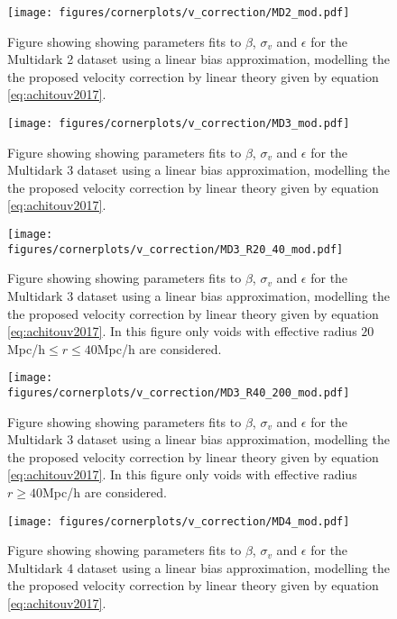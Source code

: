 \begin{figure}[htbp]
    \texttt{[image: figures/cornerplots/v\_correction/MD2\_mod.pdf]}
    \caption{Figure showing showing parameters fits to $\beta$, $\sigma_v$ and $\epsilon$ for the Multidark 2 dataset using a linear bias approximation, modelling the the proposed velocity correction by \cite{Achitouv_streaming} linear theory given by equation \ref{eq:achitouv2017}.}
    \label{fig:linbiasMD2mod}
\end{figure}

\begin{figure}[htbp]
    \texttt{[image: figures/cornerplots/v\_correction/MD3\_mod.pdf]}
    \caption{Figure showing showing parameters fits to $\beta$, $\sigma_v$ and $\epsilon$ for the Multidark 3 dataset using a linear bias approximation, modelling the the proposed velocity correction by \cite{Achitouv_streaming} linear theory given by equation \ref{eq:achitouv2017}.}
    \label{fig:linbiasMD3mod}
\end{figure}

\begin{figure}[htbp]
    \texttt{[image: figures/cornerplots/v\_correction/MD3\_R20\_40\_mod.pdf]}
    \caption{Figure showing showing parameters fits to $\beta$, $\sigma_v$ and $\epsilon$ for the Multidark 3 dataset using a linear bias approximation, modelling the the proposed velocity correction by \cite{Achitouv_streaming} linear theory given by equation \ref{eq:achitouv2017}. In this figure only voids with effective radius $20$Mpc/h$\leq r \leq 40$Mpc/h are considered.}
    \label{fig:linbiasMD3modR2040}
\end{figure}

\begin{figure}[htbp]
    \texttt{[image: figures/cornerplots/v\_correction/MD3\_R40\_200\_mod.pdf]}
    \caption{Figure showing showing parameters fits to $\beta$, $\sigma_v$ and $\epsilon$ for the Multidark 3 dataset using a linear bias approximation, modelling the the proposed velocity correction by \cite{Achitouv_streaming} linear theory given by equation \ref{eq:achitouv2017}. In this figure only voids with effective radius $r \geq 40$Mpc/h are considered.}
    \label{fig:linbiasMD3modR40}
\end{figure}


\begin{figure}[htbp]
    \texttt{[image: figures/cornerplots/v\_correction/MD4\_mod.pdf]}
    \caption{Figure showing showing parameters fits to $\beta$, $\sigma_v$ and $\epsilon$ for the Multidark 4 dataset using a linear bias approximation, modelling the the proposed velocity correction by \cite{Achitouv_streaming} linear theory given by equation \ref{eq:achitouv2017}.}
    \label{fig:linbiasMD4mod}
\end{figure}

